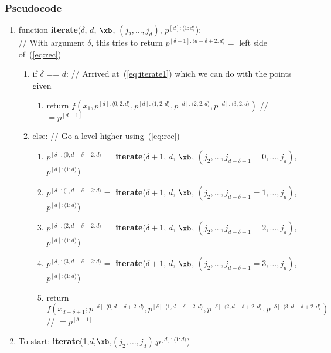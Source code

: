 \documentclass[11pt]{article}
\begin{document}

\subsubsection{Pseudocode}


\begin{enumerate}
\item function \textbf{iterate}($\delta$, $d$, $\xb$, $(j_2, \dots, j_d)$, $p^{[d]:\langle 1:d \rangle}$): \\
// With argument $\delta$, this tries to return $p^{[\delta-1]: \langle d-\delta+2:d \rangle} = $ left side of~(\ref{eq:rec})
\begin{enumerate}
\item if $\delta$ == $d$: // Arrived at~(\ref{eq:iterate1}) which we can do with the points given
\begin{enumerate}
\item return $f \left ( x_1, p^{[d]:\langle 0,2:d \rangle}, p^{[d]:\langle 1,2:d \rangle}, p^{[d]:\langle 2,2:d \rangle}, p^{[d]:\langle 3,2:d \rangle} \right )$ // $= p^{[d-1]}$
\end{enumerate}
\item else: // Go a level higher using~(\ref{eq:rec})
\begin{enumerate}
\item $p^{[\delta]: \langle 0, d-\delta+2:d \rangle} = $ \textbf{iterate}($\delta+1$, $d$, $\xb$, $( j_2, \dots, j_{d-\delta+1}=0, \dots, j_d )$, $p^{[d]:\langle 1:d \rangle}$)
\item $p^{[\delta]: \langle 1, d-\delta+2:d \rangle} = $ \textbf{iterate}($\delta+1$, $d$, $\xb$, $( j_2, \dots, j_{d-\delta+1}=1, \dots, j_d )$, $p^{[d]:\langle 1:d \rangle}$)
\item $p^{[\delta]: \langle 2, d-\delta+2:d \rangle} = $ \textbf{iterate}($\delta+1$, $d$, $\xb$, $( j_2, \dots, j_{d-\delta+1}=2, \dots, j_d )$, $p^{[d]:\langle 1:d \rangle}$)
\item $p^{[\delta]: \langle 3, d-\delta+2:d \rangle} = $ \textbf{iterate}($\delta+1$, $d$, $\xb$, $( j_2, \dots, j_{d-\delta+1}=3, \dots, j_d )$, $p^{[d]:\langle 1:d \rangle}$)
\item return $f \left ( 
x_{d-\delta+1} ; 
p^{[\delta]: \langle 0,d-\delta+2:d \rangle},
p^{[\delta]: \langle 1,d-\delta+2:d \rangle},
p^{[\delta]: \langle 2,d-\delta+2:d \rangle},
p^{[\delta]: \langle 3,d-\delta+2:d \rangle}
\right )$ // $= p^{[\delta-1]}$
\end{enumerate}
\end{enumerate}

\item To start: \textbf{iterate}(1,$d$,$\xb$,$(j_2,\dots,j_d)$,$p^{[d]:\langle 1:d \rangle}$)
\end{enumerate}
\end{document}
